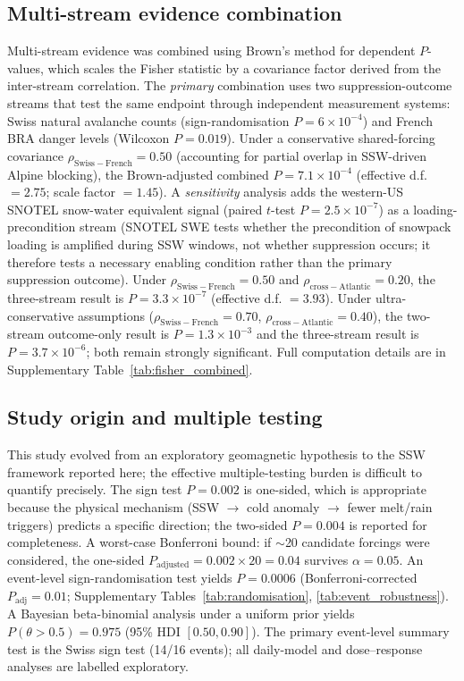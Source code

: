 \documentclass[11pt,letterpaper]{article}
\begin{document}
\subsection*{Multi-stream evidence combination}

Multi-stream evidence was combined using Brown's method for dependent $P$-values\cite{Brown1975,Poole2016}, which scales the Fisher statistic by a covariance factor derived from the inter-stream correlation. The \emph{primary} combination uses two suppression-outcome streams that test the same endpoint through independent measurement systems: Swiss natural avalanche counts (sign-randomisation $P = 6\times10^{-4}$) and French BRA danger levels (Wilcoxon $P = 0.019$). Under a conservative shared-forcing covariance $\rho_{\mathrm{Swiss-French}} = 0.50$ (accounting for partial overlap in SSW-driven Alpine blocking), the Brown-adjusted combined $P = 7.1\times10^{-4}$ (effective d.f. $= 2.75$; scale factor $= 1.45$). A \emph{sensitivity} analysis adds the western-US SNOTEL snow-water equivalent signal (paired $t$-test $P = 2.5\times10^{-7}$) as a loading-precondition stream (SNOTEL SWE tests whether the precondition of snowpack loading is amplified during SSW windows, not whether suppression occurs; it therefore tests a necessary enabling condition rather than the primary suppression outcome). Under $\rho_{\mathrm{Swiss-French}} = 0.50$ and $\rho_{\mathrm{cross-Atlantic}} = 0.20$, the three-stream result is $P = 3.3\times10^{-7}$ (effective d.f. $= 3.93$). Under ultra-conservative assumptions ($\rho_{\mathrm{Swiss-French}} = 0.70$, $\rho_{\mathrm{cross-Atlantic}} = 0.40$), the two-stream outcome-only result is $P = 1.3\times10^{-3}$ and the three-stream result is $P = 3.7\times10^{-6}$; both remain strongly significant. Full computation details are in Supplementary Table~\ref{tab:fisher_combined}.

\subsection*{Study origin and multiple testing}

This study evolved from an exploratory geomagnetic hypothesis to the SSW framework reported here; the effective multiple-testing burden is difficult to quantify precisely. The sign test $P = 0.002$ is one-sided, which is appropriate because the physical mechanism (SSW $\to$ cold anomaly $\to$ fewer melt/rain triggers) predicts a specific direction; the two-sided $P = 0.004$ is reported for completeness. A worst-case Bonferroni bound: if $\sim$20 candidate forcings were considered, the one-sided $P_{\mathrm{adjusted}} = 0.002 \times 20 = 0.04$ survives $\alpha = 0.05$. An event-level sign-randomisation test yields $P = 0.0006$ (Bonferroni-corrected $P_{\mathrm{adj}} = 0.01$; Supplementary Tables~\ref{tab:randomisation}, \ref{tab:event_robustness}). A Bayesian beta-binomial analysis under a uniform prior yields $P(\theta > 0.5) = 0.975$ (95\% HDI $[0.50, 0.90]$). The primary event-level summary test is the Swiss sign test (14/16 events); all daily-model and dose--response analyses are labelled exploratory.
\end{document}
